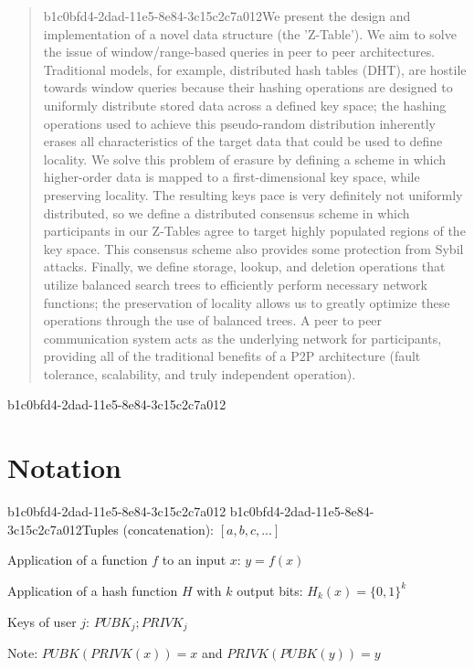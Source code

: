 \documentclass[12pt]{article}
\begin{document}
\maketitle

\begin{abstract}
b1c0bfd4-2dad-11e5-8e84-3c15c2c7a012We present the design and implementation of a novel data structure (the 'Z-Table'). We aim to solve the issue of window/range-based queries in peer to peer architectures. Traditional models, for example,  distributed hash tables (DHT), are hostile towards window queries because their hashing operations are designed to uniformly distribute stored data across a defined key space; the hashing operations used to achieve this pseudo-random distribution inherently erases all characteristics of the target data that could be used to define locality. We solve this problem of erasure by defining a scheme in which higher-order data is mapped to a first-dimensional key space, while preserving locality. The resulting keys pace is very definitely not uniformly distributed, so we define a distributed consensus scheme in which participants in our Z-Tables agree to target highly populated regions of the key space. This consensus scheme also provides some protection from Sybil attacks. Finally, we define storage, lookup, and deletion operations that utilize balanced search trees to efficiently perform necessary network functions; the preservation of locality allows us to greatly optimize these operations through the use of balanced trees. A peer to peer communication system acts as the underlying network for participants, providing all of the traditional benefits of a P2P architecture (fault tolerance, scalability, and truly independent operation).
\end{abstract}
b1c0bfd4-2dad-11e5-8e84-3c15c2c7a012
\section{Notation}
b1c0bfd4-2dad-11e5-8e84-3c15c2c7a012
b1c0bfd4-2dad-11e5-8e84-3c15c2c7a012Tuples (concatenation): $[a,b,c,...]$

Application of a function $f$ to an input $x$: $y=f(x)$

Application of a hash function $H$ with $k$ output bits: $H_{k}(x) = \{0,1\}^k$

Keys of user $j$: $ PUBK_j; PRIVK_j $

Note: $PUBK(PRIVK(x)) = x$ and $PRIVK(PUBK(y)) = y$~
\end{document}
